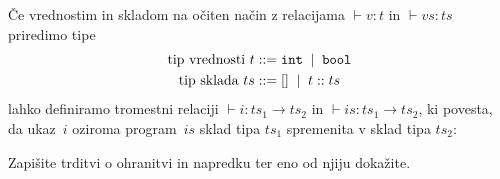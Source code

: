 \documentclass[arhiv]{../izpit}
\begin{document}
Če vrednostim in skladom na očiten način z relacijama $\vdash v : t$ in $\vdash vs : ts$ priredimo tipe
%
\begin{align*}
  \text{tip vrednosti $t$} \mathrel{{:}{:}{=}} {}
   & \mathtt{int} \;\mid\;
  \mathtt{bool}          \\
  \text{tip sklada $ts$} \mathrel{{:}{:}{=}} {}
   & [] \;\mid\;
  t :: ts
\end{align*}
%
lahko definiramo tromestni relaciji $\vdash i : ts_1 \to ts_2$ in $\vdash is : ts_1 \to ts_2$, ki povesta, da ukaz~$i$ oziroma program~$is$ sklad tipa $ts_1$ spremenita v sklad tipa $ts_2$:
%
%
Zapišite trditvi o ohranitvi in napredku ter eno od njiju dokažite.

\nadaljevanje
\end{document}
